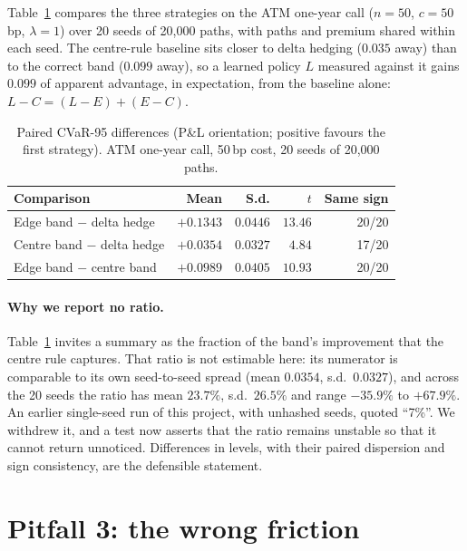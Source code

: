 \documentclass{article}
\newcommand{\cvar}{CVaR-95}
\newcommand{\bps}{\,bp}
\begin{document}
Table~\ref{tab:band} compares the three strategies on the ATM one-year call ($n = 50$,
$c = 50$\bps{}, $\lambda = 1$) over 20 seeds of 20{,}000 paths, with paths and premium shared
within each seed. The centre-rule baseline sits closer to delta hedging ($0.035$ away) than to the
correct band ($0.099$ away), so a learned policy $L$ measured against it gains $0.099$ of apparent
advantage, in expectation, from the baseline alone: $L - C = (L - E) + (E - C)$.

\begin{table}[t]
  \caption{Paired \cvar{} differences (P\&L orientation; positive favours the first strategy).
    ATM one-year call, 50\bps{} cost, 20 seeds of 20{,}000 paths.}
  \label{tab:band}
  \centering
  \small
  \begin{tabular}{lrrrr}
    \toprule
    Comparison & Mean & S.d. & $t$ & Same sign \\
    \midrule
    Edge band $-$ delta hedge   & $+0.1343$ & $0.0446$ & $13.46$ & 20/20 \\
    Centre band $-$ delta hedge & $+0.0354$ & $0.0327$ & $4.84$  & 17/20 \\
    Edge band $-$ centre band   & $+0.0989$ & $0.0405$ & $10.93$ & 20/20 \\
    \bottomrule
  \end{tabular}
\end{table}

\paragraph{Why we report no ratio.} Table~\ref{tab:band} invites a summary as the fraction of the
band's improvement that the centre rule captures. That ratio is not estimable here: its numerator
is comparable to its own seed-to-seed spread (mean $0.0354$, s.d.\ $0.0327$), and across the 20
seeds the ratio has mean $23.7\%$, s.d.\ $26.5\%$ and range $-35.9\%$ to $+67.9\%$. An earlier
single-seed run of this project, with unhashed seeds, quoted ``7\%''. We withdrew it, and a test
now asserts that the ratio remains unstable so that it cannot return unnoticed. Differences in
levels, with their paired dispersion and sign consistency, are the defensible statement.

\section{Pitfall 3: the wrong friction}\label{sec:friction}
\end{document}
